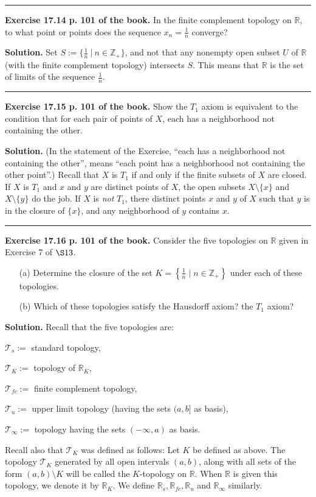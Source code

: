 \documentclass[12pt,letterpaper]{article}
\newcommand{\hs}{\bigskip\hrule\medskip}
\newcommand{\noi}{\noindent}%
\newcommand{\sm}{\setminus}
\newcommand{\R}{\mathbb R}
\newcommand{\T}{\mathcal T}
\newcommand{\Z}{\mathbb Z}
\begin{document}
\hs 

\noi\textbf{Exercise 17.14 p. 101 of the book.} In the finite complement topology on $\mathbb{R}$, to what point or points does the sequence $x_{n}=\frac1n$ converge? 

\noi\textbf{Solution.} Set $S:=\{\frac1n\ |\ n\in\Z_+\}$, and not that any nonempty open subset $U$ of $\R$ (with the finite complement topology) intersects $S$. This means that $\R$ is the set of limits of the sequence $\frac1n$. 

\hs 

\noi\textbf{Exercise 17.15 p. 101 of the book.} Show the $T_{1}$ axiom is equivalent to the condition that for each pair of points of $X$, each has a neighborhood not containing the other. 

\noi\textbf{Solution.} (In the statement of the Exercise, ``each has a neighborhood not containing the other'', means ``each point has a neighborhood not containing the other point''.) Recall that $X$ is $T_1$ if and only if the finite subsets of $X$ are closed. If $X$ is $T_1$ and $x$ and $y$ are distinct points of $X$, the open subsets $X\sm\{x\}$ and $X\sm\{y\}$ do the job. If $X$ is \emph{not} $T_1$, there distinct points $x$ and $y$ of $X$ such that $y$ is in the closure of $\{x\}$, and any neighborhood of $y$ contains $x$. 

\hs

\noi\textbf{Exercise 17.16 p. 101 of the book.} Consider the five topologies on $\mathbb{R}$ given in Exercise 7 of $\S 13$. 
    \begin{enumerate}
        \item[(a)] Determine the closure of the set $K=\left\{\frac1n\mid n\in \mathbb{Z}_{+}\right\}$ under each of these topologies.
        \item[(b)] Which of these topologies satisfy the Hausdorff axiom? the $T_{1}$ axiom?
    \end{enumerate}

\noi\textbf{Solution.} Recall that the five topologies are: 

$\T_s:=$ standard topology, 

$\T_K:=$ topology of $\R_K$, 

$\T_{fc}:=$ finite complement topology, 

$\T_u:=$ upper limit topology (having the sets $(a,b]$ as basis), 

$\T_\infty:=$ topology having the sets $(-\infty,a)$ as basis. 

\noi Recall also that $\T_K$ was defined as follows: Let $K$ be defined as above. The topology $\T_K$ generated by all open intervals $(a,b)$, along with all sets of the form $(a,b)\sm K$ will be called the $K$-topology on $\R$. When $\R$ is given this topology, we denote it by $\R_K$. We define $\R_s,\R_{fc},\R_u$ and $\R_\infty$ similarly. 
\end{document}
